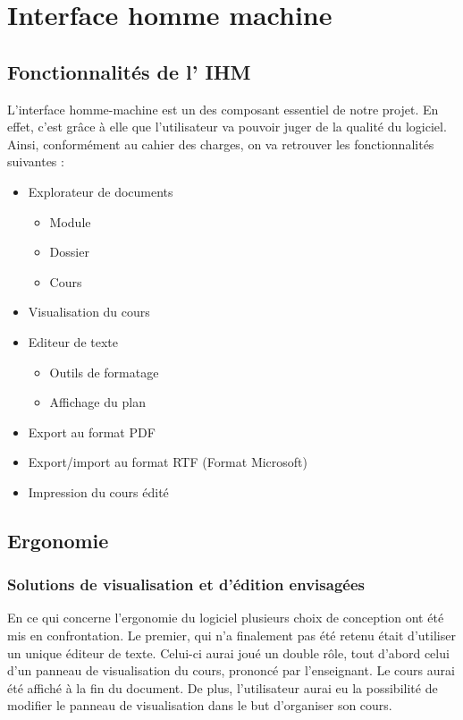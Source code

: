 
\chapter{Interface homme machine}

\section{Fonctionnalités de l' IHM}

L'interface homme-machine est un des composant essentiel de notre projet. En effet, c'est grâce à elle que l'utilisateur va pouvoir juger de la qualité du logiciel. Ainsi, conformément au  cahier des charges, on va retrouver les fonctionnalités suivantes :

\begin{itemize}
 \item Explorateur de documents
\begin{itemize}
 \item Module
 \item Dossier
 \item Cours
\end{itemize} 
 \item Visualisation du cours
 \item Editeur de texte
\begin{itemize}
 \item Outils de formatage
 \item Affichage du plan 
\end{itemize} 
 \item Export au format PDF
 \item Export/import au format RTF (Format Microsoft)
 \item Impression du cours édité

\end{itemize}



\section{Ergonomie}

\subsection{Solutions de visualisation et d'édition envisagées}

En ce qui concerne l'ergonomie du logiciel plusieurs choix de conception ont été mis en confrontation. Le premier, qui n'a finalement pas été retenu était d'utiliser un unique éditeur de texte. Celui-ci aurai joué un  double rôle, tout d'abord celui d'un panneau de visualisation du cours, prononcé par l'enseignant. Le cours aurai été affiché à la fin du document. De plus, l'utilisateur aurai eu la possibilité de modifier le panneau de visualisation dans le but d'organiser son  cours.

